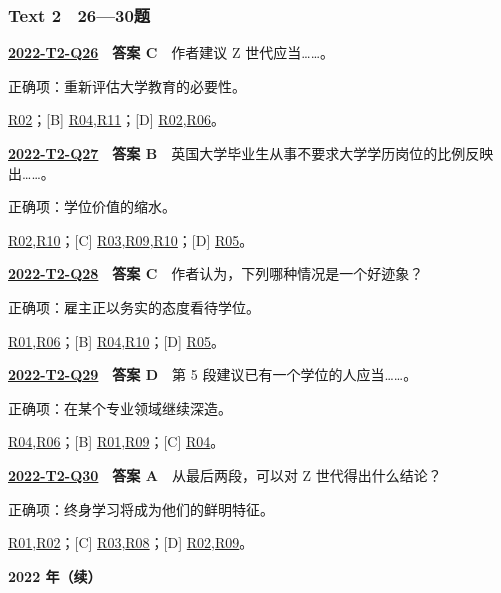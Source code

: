 \documentclass[11pt,a4paper]{article}
\begin{document}
\subsubsection{Text 2　26—30题}
\label{idx-2022-T2-Q26}
\noindent\textbf{\href{https://zj139.github.io/math-notes/english/dd28b36818ffbb1e3da1879a/\#q26}{2022-T2-Q26}　答案 C}　作者建议 Z 世代应当……。\par\nopagebreak
\noindent 正确项：重新评估大学教育的必要性。\par\nopagebreak
\noindent [A] \hyperref[cat-R02]{R02}；[B] \hyperref[cat-R04]{R04},\hyperref[cat-R11]{R11}；[D] \hyperref[cat-R02]{R02},\hyperref[cat-R06]{R06}。
\par\smallskip
{}\label{idx-2022-T2-Q27}
\noindent\textbf{\href{https://zj139.github.io/math-notes/english/dd28b36818ffbb1e3da1879a/\#q27}{2022-T2-Q27}　答案 B}　英国大学毕业生从事不要求大学学历岗位的比例反映出……。\par\nopagebreak
\noindent 正确项：学位价值的缩水。\par\nopagebreak
\noindent [A] \hyperref[cat-R02]{R02},\hyperref[cat-R10]{R10}；[C] \hyperref[cat-R03]{R03},\hyperref[cat-R09]{R09},\hyperref[cat-R10]{R10}；[D] \hyperref[cat-R05]{R05}。
\par\smallskip
{}\label{idx-2022-T2-Q28}
\noindent\textbf{\href{https://zj139.github.io/math-notes/english/dd28b36818ffbb1e3da1879a/\#q28}{2022-T2-Q28}　答案 C}　作者认为，下列哪种情况是一个好迹象？\par\nopagebreak
\noindent 正确项：雇主正以务实的态度看待学位。\par\nopagebreak
\noindent [A] \hyperref[cat-R01]{R01},\hyperref[cat-R06]{R06}；[B] \hyperref[cat-R04]{R04},\hyperref[cat-R10]{R10}；[D] \hyperref[cat-R05]{R05}。
\par\smallskip
{}\label{idx-2022-T2-Q29}
\noindent\textbf{\href{https://zj139.github.io/math-notes/english/dd28b36818ffbb1e3da1879a/\#q29}{2022-T2-Q29}　答案 D}　第 5 段建议已有一个学位的人应当……。\par\nopagebreak
\noindent 正确项：在某个专业领域继续深造。\par\nopagebreak
\noindent [A] \hyperref[cat-R04]{R04},\hyperref[cat-R06]{R06}；[B] \hyperref[cat-R01]{R01},\hyperref[cat-R09]{R09}；[C] \hyperref[cat-R04]{R04}。
\par\smallskip
{}\label{idx-2022-T2-Q30}
\noindent\textbf{\href{https://zj139.github.io/math-notes/english/dd28b36818ffbb1e3da1879a/\#q30}{2022-T2-Q30}　答案 A}　从最后两段，可以对 Z 世代得出什么结论？\par\nopagebreak
\noindent 正确项：终身学习将成为他们的鲜明特征。\par\nopagebreak
\noindent [B] \hyperref[cat-R01]{R01},\hyperref[cat-R02]{R02}；[C] \hyperref[cat-R03]{R03},\hyperref[cat-R08]{R08}；[D] \hyperref[cat-R02]{R02},\hyperref[cat-R09]{R09}。
\par\smallskip
\clearpage\noindent\textbf{2022 年（续）}\par
\end{document}
